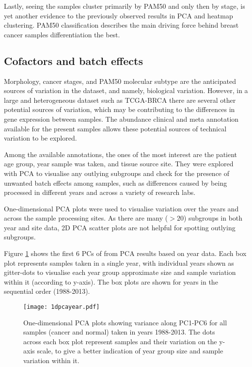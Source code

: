     Lastly, seeing the samples cluster primarily by PAM50 and only then by stage, is yet another evidence to the previously observed results in PCA and heatmap clustering. PAM50 classification describes the main driving force behind breast cancer samples differentiation the best.  
    

    
    \newpage
    \subsection{Cofactors and batch effects}
    
    Morphology, cancer stages, and PAM50 molecular subtype are the anticipated sources of variation in the dataset, and namely, biological variation. However, in a large and heterogeneous dataset such as TCGA-BRCA there are several other potential sources of variation, which may be contributing to the differences in gene expression between samples. The abundance clinical and meta annotation available for the present samples allows these potential sources of technical variation to be explored.
    
    Among the available annotations, the ones of the most interest are the patient age group, year sample was taken, and tissue source site. They were explored with PCA to visualise any outlying subgroups and check for the presence of unwanted batch effects among samples, such as differences caused by being processed in different years and across a variety of research labs.
    
    One-dimensional PCA plots were used to visualise variation over the years and across the sample processing sites. As there are many ($>20$) subgroups in both year and site data, 2D PCA scatter plots are not helpful for spotting outlying subgroups. 
    
    Figure \ref{fig:1dpcayear} shows the first 6 PCs of from PCA results based on year data. Each box plot represents samples taken in a single year, with individual years shown as gitter-dots to visualise each year group approximate size and sample variation within it (according to y-axis). The box plots are shown for years in the sequential order (1988-2013). \\
  
        
            \begin{figure}[!h]
            \centering
            \texttt{[image: 1dpcayear.pdf]}
            \caption[1D PCA plot based on year data]{One-dimensional PCA plots showing variance along PC1-PC6 for all samples (cancer and normal) taken in years 1988-2013. The dots across each box plot represent samples and their variation on the y-axis scale, to give a better indication of year group size and sample variation within it.}
            \label{fig:1dpcayear}
            \end{figure}
    
